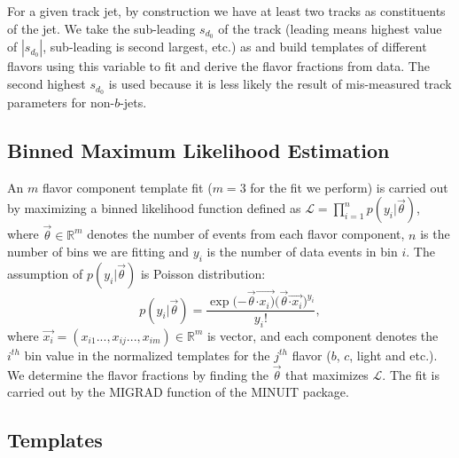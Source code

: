 For a given track jet, by construction we have at least two tracks as constituents of the jet. %
We take the sub-leading $s_{d_{0}}$ of the track (leading means highest value of $|s_{d_{0}}|$, sub-leading is second largest, etc.) as \subsdzero and build templates of different flavors using this variable to fit and derive the flavor fractions from data.   The second highest $s_{d_{0}}$ is used because it is less likely the result of mis-measured track parameters for non-$b$-jets. 





\subsection{Binned Maximum Likelihood Estimation}

An $m$ flavor component template fit ($m = 3$ for the fit we perform) is carried out by maximizing a binned likelihood function defined as $\mathcal{L} = \prod _{i=1} ^n p(y_i| \vec{\theta})$, where $\vec{\theta} \in \mathbb{R}^m$ denotes the number of events from each flavor component, $n$ is the number of bins we are fitting and $y_i$ is the number of data events in bin $i$. The assumption of $p(y_i|\vec{\theta})$ is Poisson distribution: 
\begin{equation}
p(y_i|\vec{\theta}) = \frac{\exp{(-\vec{\theta} \vec{\cdot x_i)}} {(\vec{\theta}} \vec{\cdot x_i})^{y_i}}{y_i !}, 
\end{equation}
where $\vec{x_i}=(x_{i1}...,x_{ij}...,x_{im}) \in \mathbb{R}^m$ is vector, and each component denotes the $i^{th}$ bin value in the normalized templates for the $j^{th}$ flavor ($b$, $c$, light and etc.).   We determine the flavor fractions by finding the $\vec{\theta}$ that maximizes $\mathcal{L}$. The fit is carried out by the MIGRAD function of the MINUIT package. 

\subsection{\subsdzero Templates }

